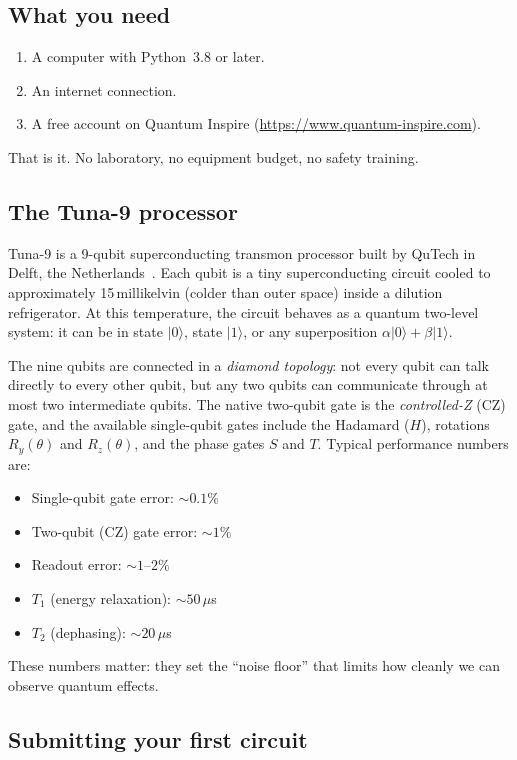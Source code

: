 \documentclass[amsmath,amssymb,reprint,aps,prb]{revtex4-2}
\newcommand{\ket}[1]{|#1\rangle}
\begin{document}
\subsection{What you need}

\begin{enumerate}
\item A computer with Python~3.8 or later.
\item An internet connection.
\item A free account on Quantum Inspire
      (\url{https://www.quantum-inspire.com}).
\end{enumerate}
That is it.  No laboratory, no equipment budget, no safety training.

\subsection{The Tuna-9 processor}

Tuna-9 is a 9-qubit superconducting transmon processor built by
QuTech in Delft, the Netherlands~\cite{Tuna9}.  Each qubit is a
tiny superconducting circuit cooled to approximately 15\,millikelvin
(colder than outer space) inside a dilution refrigerator.  At this
temperature, the circuit behaves as a quantum two-level system: it
can be in state $\ket{0}$, state $\ket{1}$, or any superposition
$\alpha\ket{0} + \beta\ket{1}$.

The nine qubits are connected in a \emph{diamond topology}: not
every qubit can talk directly to every other qubit, but any two
qubits can communicate through at most two intermediate qubits.
The native two-qubit gate is the \emph{controlled-Z} (CZ) gate,
and the available single-qubit gates include the Hadamard ($H$),
rotations $R_y(\theta)$ and $R_z(\theta)$, and the phase gates
$S$ and $T$.  Typical performance numbers are:
\begin{itemize}
\item Single-qubit gate error: $\sim 0.1\%$
\item Two-qubit (CZ) gate error: $\sim 1\%$
\item Readout error: $\sim 1$--$2\%$
\item $T_1$ (energy relaxation): $\sim 50\,\mu$s
\item $T_2$ (dephasing): $\sim 20\,\mu$s
\end{itemize}
These numbers matter: they set the ``noise floor'' that limits
how cleanly we can observe quantum effects.

\subsection{Submitting your first circuit}
\end{document}

